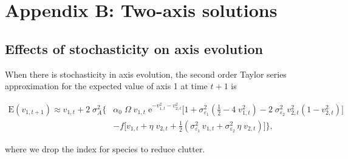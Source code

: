 
\renewcommand{\thefigure}{B\arabic{figure}}
\renewcommand{\theequation}{B\arabic{equation}}
\renewcommand{\thetable}{B\arabic{table}}
\setcounter{equation}{0}
\setcounter{figure}{0}
\setcounter{table}{0}


\section*{Appendix B: Two-axis solutions}



\subsection*{Effects of stochasticity on axis evolution}

When there is stochasticity in axis evolution,
the second order Taylor series approximation for the expected
value of axis 1 at time $t+1$ is

\begin{equation}
\label{eq:taylor-expansion-final}
\begin{split}
    \text{E}(v_{1,t+1}) \approx
        v_{1,t} + 2 \; \sigma_A^2 \Bigg\{ 
            & \alpha_0 \; \Omega \; v_{1,t} \; \text{e}^{-v_{1,t}^2 - v_{2,t}^2} 
            \bigg[ 
                1 + \sigma^2_{\varepsilon_1} \left( \frac{1}{2} - 4 \; v_{1,t}^2 \right)
                - 2 \; \sigma^2_{\varepsilon_2} \, v_{2,t}^2 \left( 1 - v_{2,t}^2 \right)
            \bigg] \\
            & - f \bigg[
                v_{1,t} + \eta \; v_{2,t} + \frac{1}{2} \left(
                    \sigma^2_{\varepsilon_1} \, v_{1,t} + \sigma^2_{\varepsilon_2} \, \eta \; v_{2,t}
                \right)
            \bigg]
        \Bigg\}
\text{,}
\end{split}
\end{equation}

where we drop the index for species to reduce clutter.


